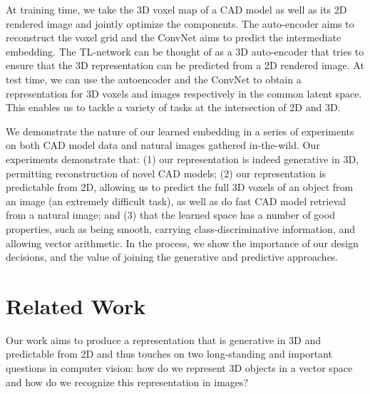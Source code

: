 \documentclass[runningheads]{llncs}
\begin{document}
At training time, we take the 3D voxel map of a CAD model 
as well as its 2D
rendered image and jointly optimize the components. The auto-encoder aims to
reconstruct the voxel grid and the ConvNet aims to predict the intermediate
embedding.  
The TL-network can be thought of as a 3D auto-encoder that tries to
ensure that the 3D representation can be predicted from a 2D rendered image. 
At test 
time, we can use the autoencoder and the ConvNet
to obtain a representation 
for 3D voxels and images respectively in the common latent space.
This enables us to tackle a variety of tasks at the
intersection of 2D and 3D.

We demonstrate the nature of our learned embedding in a series of experiments
on both CAD model data and natural images gathered in-the-wild.
Our experiments demonstrate that: (1) our representation is indeed generative in 3D, permitting
reconstruction of novel CAD models; (2) our representation is predictable from 2D, allowing us
to predict the full 3D voxels of an object from an image
(an extremely difficult task),
as well as do fast CAD model retrieval from a natural image; and (3) that the learned space 
has a number of good properties, such as being smooth, carrying class-discriminative
information, and allowing vector arithmetic. In the process,
we show the importance
of our design decisions, and the value of joining the generative and predictive approaches.


\section{Related Work}

Our work aims to produce a representation that is generative in 3D and
predictable from 2D and thus touches on two long-standing and important
questions in computer vision: how do we represent 3D objects in a vector space
and how do we recognize this representation in images? 
\end{document}
